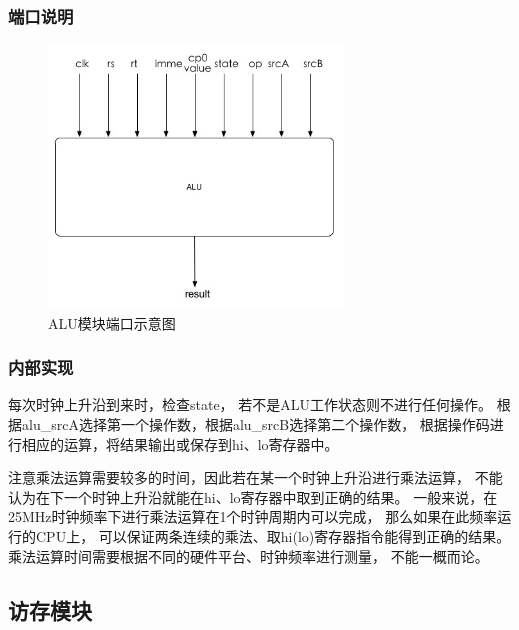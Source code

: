         \subsubsection{端口说明}
            
            \begin{figure}[!hbp]
                \centering
                \caption{ALU模块端口示意图}
                \includegraphics[width=0.7\textwidth]{chart/alu.jpg}
            \end{figure}

        \subsubsection{内部实现}
            每次时钟上升沿到来时，检查state，%
            若不是ALU工作状态则不进行任何操作。%
            根据alu\_srcA选择第一个操作数，根据alu\_srcB选择第二个操作数，%
            根据操作码进行相应的运算，将结果输出或保存到hi、lo寄存器中。

            注意乘法运算需要较多的时间，因此若在某一个时钟上升沿进行乘法运算，%
            不能认为在下一个时钟上升沿就能在hi、lo寄存器中取到正确的结果。%
            一般来说，在25MHz时钟频率下进行乘法运算在1个时钟周期内可以完成，%
            那么如果在此频率运行的CPU上，%
            可以保证两条连续的乘法、取hi(lo)寄存器指令能得到正确的结果。%
            乘法运算时间需要根据不同的硬件平台、时钟频率进行测量，%
            不能一概而论。
    \subsection{访存模块}
